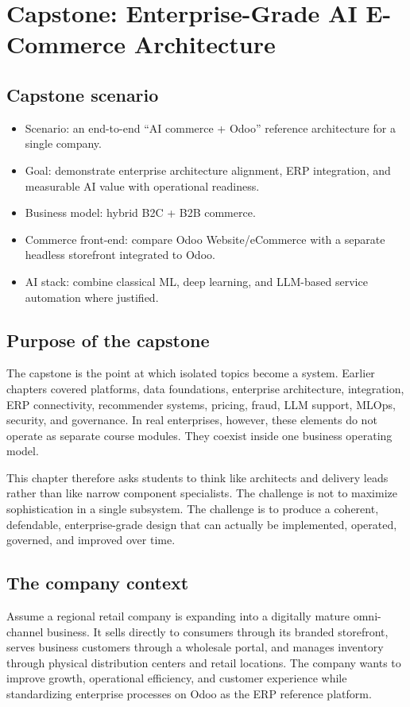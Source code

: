 \chapter[Capstone Architecture]{Capstone: Enterprise-Grade AI E-Commerce Architecture}

\section{Capstone scenario}
\begin{itemize}
  \item Scenario: an end-to-end ``AI commerce + Odoo'' reference architecture for a single company.
  \item Goal: demonstrate enterprise architecture alignment, ERP integration, and measurable AI value with operational readiness.
  \item Business model: hybrid B2C + B2B commerce.
  \item Commerce front-end: compare Odoo Website/eCommerce with a separate headless storefront integrated to Odoo.
  \item AI stack: combine classical ML, deep learning, and LLM-based service automation where justified.
\end{itemize}

\section{Purpose of the capstone}
The capstone is the point at which isolated topics become a system. Earlier chapters covered platforms, data foundations, enterprise architecture, integration, ERP connectivity, recommender systems, pricing, fraud, LLM support, MLOps, security, and governance. In real enterprises, however, these elements do not operate as separate course modules. They coexist inside one business operating model.

This chapter therefore asks students to think like architects and delivery leads rather than like narrow component specialists. The challenge is not to maximize sophistication in a single subsystem. The challenge is to produce a coherent, defendable, enterprise-grade design that can actually be implemented, operated, governed, and improved over time.

\section{The company context}
Assume a regional retail company is expanding into a digitally mature omni-channel business. It sells directly to consumers through its branded storefront, serves business customers through a wholesale portal, and manages inventory through physical distribution centers and retail locations. The company wants to improve growth, operational efficiency, and customer experience while standardizing enterprise processes on Odoo as the ERP reference platform.

